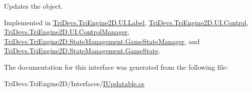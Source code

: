 Updates the object. 



Implemented in \hyperlink{class_tri_devs_1_1_tri_engine2_d_1_1_u_i_1_1_label_a97e8c9ee95cedecab10ba505438e0d1b}{Tri\-Devs.\-Tri\-Engine2\-D.\-U\-I.\-Label}, \hyperlink{class_tri_devs_1_1_tri_engine2_d_1_1_u_i_1_1_control_aa8d0ceefa447589c60c278adfe059be1}{Tri\-Devs.\-Tri\-Engine2\-D.\-U\-I.\-Control}, \hyperlink{class_tri_devs_1_1_tri_engine2_d_1_1_u_i_1_1_control_manager_a9961980ad217dbeafc3890f7f45f2e08}{Tri\-Devs.\-Tri\-Engine2\-D.\-U\-I.\-Control\-Manager}, \hyperlink{class_tri_devs_1_1_tri_engine2_d_1_1_state_management_1_1_game_state_manager_ab983ca2818bff5c3bd7cf0cc342d0d4c}{Tri\-Devs.\-Tri\-Engine2\-D.\-State\-Management.\-Game\-State\-Manager}, and \hyperlink{class_tri_devs_1_1_tri_engine2_d_1_1_state_management_1_1_game_state_a98663c5a2d77ebee9ed0f1dd91f6509a}{Tri\-Devs.\-Tri\-Engine2\-D.\-State\-Management.\-Game\-State}.



The documentation for this interface was generated from the following file\-:\begin{DoxyCompactItemize}
\item 
Tri\-Devs.\-Tri\-Engine2\-D/\-Interfaces/\hyperlink{_i_updatable_8cs}{I\-Updatable.\-cs}\end{DoxyCompactItemize}
